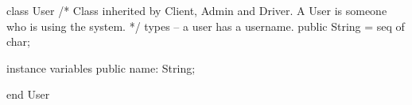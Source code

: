 \begin{vdmpp}[breaklines=true]
class User
/*
    Class inherited by Client, Admin and Driver. A User is someone who is using the system.
*/
types
    -- a user has a username.
    public String = seq of char;

instance variables
    public name: String;

end User
\end{vdmpp}
